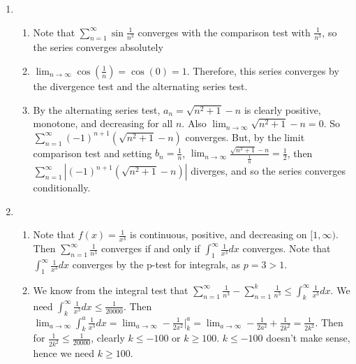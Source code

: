 \documentclass[10pt,english]{article}
\begin{document}
\begin{enumerate}
\item \begin{enumerate}
    \item Note that $\sum_{n=1}^\infty\sin\frac{1}{n^3}$ converges with the comparison test with $\frac{1}{n^3}$, so the series converges absolutely
    \item $\lim_{n\rightarrow\infty}\cos(\frac{1}{n})=\cos(0)=1$. Therefore, this series converges by the divergence test and the alternating series test. 
    \item By the alternating series test, $a_n=\sqrt{n^2+1}-n$ is clearly positive, monotone, and decreasing for all $n$. Also $\lim_{n\rightarrow\infty}\sqrt{n^2+1}-n=0$. So $\sum_{n=1}^\infty(-1)^{n+1}(\sqrt{n^2+1}-n)$ converges. But, by the limit comparison test and setting $b_n=\frac{1}{n}$, $\lim_{n\rightarrow\infty}\frac{\sqrt{n^2+1}-n}{\frac{1}{n}}=\frac{1}{2}$, then $\sum_{n=1}^\infty|(-1)^{n+1}(\sqrt{n^2+1}-n)|$ diverges, and so the series converges conditionally. 
\end{enumerate}



\item \begin{enumerate}
    \item Note that $f(x)=\frac{1}{x^3}$ is continuous, positive, and decreasing on $[1,\infty)$. Then $\sum_{n=1}^\infty\frac{1}{n^3}$ converges if and only if $\int_1^\infty\frac{1}{x^3}dx$ converges. Note that $\int_1^\infty\frac{1}{x^3}dx$ converges by the p-test for integrals, as $p=3>1$. 
    \item We know from the integral test that $\sum_{n=1}^\infty\frac{1}{n^3}-\sum_{n=1}^k\frac{1}{n^3}\leq\int_k^\infty\frac{1}{x^3}dx$. We need $\int_k^\infty\frac{1}{x^3}dx\leq\frac{1}{20000}$. Then $\lim_{a\rightarrow\infty}\int_k^a\frac{1}{x^3}dx=\lim_{a\rightarrow\infty}-\frac{1}{2x^2}|_k^a=\lim_{a\rightarrow\infty}-\frac{1}{2a^2}+\frac{1}{2k^2}=\frac{1}{2k^2}$. Then for $\frac{1}{2k^2}\leq\frac{1}{20000}$, clearly $k\leq-100$ or $k\geq100$. $k\leq-100$ doesn't make sense, hence we need $k\geq100$.
\end{enumerate}




\end{enumerate}
\end{document}
